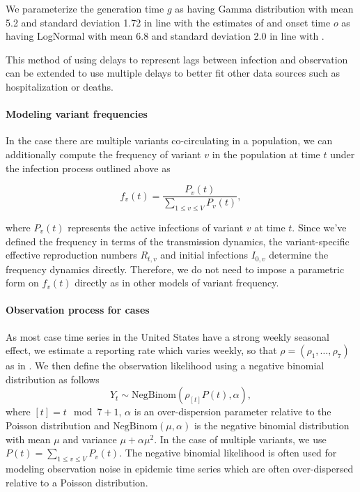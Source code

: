 \documentclass[11pt,oneside,letterpaper]{article}
\begin{document}
We parameterize the generation time $g$ as having Gamma distribution with mean 5.2 and standard deviation 1.72 in line with the estimates of \cite{Ganyani2020} and onset time $o$ as having LogNormal with mean 6.8 and standard deviation 2.0 in line with \cite{Cheng2021}.

This method of using delays to represent lags between infection and observation can be extended to use multiple delays to better fit other data sources such as hospitalization or deaths.

\paragraph{Modeling variant frequencies}%

In the case there are multiple variants co-circulating in a population, we can additionally compute the frequency of variant $v$ in the population at time $t$ under the infection process outlined above as

\begin{equation}
  f_{v}(t) = \frac{P_{v}(t)}{ \sum_{1\leq v \leq V} P_{v}(t)},
\end{equation}

where $P_{v}(t)$ represents the active infections of variant $v$ at time $t$.
Since we've defined the frequency in terms of the transmission dynamics, the variant-specific effective reproduction numbers $R_{t,v}$ and initial infections $I_{0, v}$ determine the frequency dynamics directly.
Therefore, we do not need to impose a parametric form on $f_{v}(t)$ directly as in other models of variant frequency.

\paragraph{Observation process for cases}%

As most case time series in the United States have a strong weekly seasonal effect, we estimate a reporting rate which varies weekly, so that $\rho = (\rho_{1}, \ldots, \rho_{7})$ as in \cite{Abbott2020}.
We then define the observation likelihood using a negative binomial distribution as follows
\begin{equation}
  Y_{t} \sim \text{NegBinom}(\rho_{[t]} P(t),  \alpha),
\end{equation}
where $[t] = t \mod 7 + 1$, $\alpha$ is an over-dispersion parameter relative to the Poisson distribution and $\text{NegBinom}(\mu, \alpha)$ is the negative binomial distribution with mean $\mu$ and variance  $\mu + \alpha\mu^{2}$. In the case of multiple variants, we use $P(t) = \sum_{1\leq v \leq V} P_{v}(t)$.
The negative binomial likelihood is often used for modeling observation noise in epidemic time series which are often over-dispersed relative to a Poisson distribution. %
\end{document}
